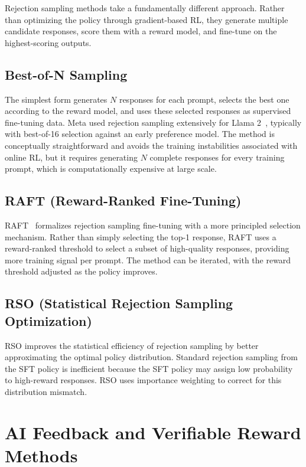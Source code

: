 \documentclass[12pt]{article}
\begin{document}
Rejection sampling methods take a fundamentally different approach. Rather than optimizing the policy through gradient-based RL, they generate multiple candidate responses, score them with a reward model, and fine-tune on the highest-scoring outputs.

\subsection{Best-of-N Sampling}

The simplest form generates $N$ responses for each prompt, selects the best one according to the reward model, and uses these selected responses as supervised fine-tuning data. Meta used rejection sampling extensively for Llama 2~\cite{Touvron2023Llama2}, typically with best-of-16 selection against an early preference model. The method is conceptually straightforward and avoids the training instabilities associated with online RL, but it requires generating $N$ complete responses for every training prompt, which is computationally expensive at large scale.

\subsection{RAFT (Reward-Ranked Fine-Tuning)}

RAFT~\cite{Dong2023RAFT} formalizes rejection sampling fine-tuning with a more principled selection mechanism. Rather than simply selecting the top-1 response, RAFT uses a reward-ranked threshold to select a subset of high-quality responses, providing more training signal per prompt. The method can be iterated, with the reward threshold adjusted as the policy improves.

\subsection{RSO (Statistical Rejection Sampling Optimization)}

RSO improves the statistical efficiency of rejection sampling by better approximating the optimal policy distribution. Standard rejection sampling from the SFT policy is inefficient because the SFT policy may assign low probability to high-reward responses. RSO uses importance weighting to correct for this distribution mismatch.


\section{AI Feedback and Verifiable Reward Methods}
\end{document}
